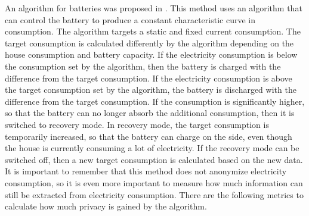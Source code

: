 An algorithm for batteries was proposed in \cite{mclaughlin2011protecting}. This method uses an algorithm that can control the battery to produce a constant characteristic curve in consumption. The algorithm targets a static and fixed current consumption. The target consumption is calculated differently by the algorithm depending on the house consumption and battery capacity. If the electricity consumption is below the consumption set by the algorithm, then the battery is charged with the difference from the target consumption. If the electricity consumption is above the target consumption set by the algorithm, the battery is discharged with the difference from the target consumption. If the consumption is significantly higher, so that the battery can no longer absorb the additional consumption, then it is switched to recovery mode. In recovery mode, the target consumption is temporarily increased, so that the battery can charge on the side, even though the house is currently consuming a lot of electricity. If the recovery mode can be switched off, then a new target consumption is calculated based on the new data. It is important to remember that this method does not anonymize electricity consumption, so it is even more important to measure how much information can still be extracted from electricity consumption. There are the following metrics to calculate how much privacy is gained by the algorithm.
